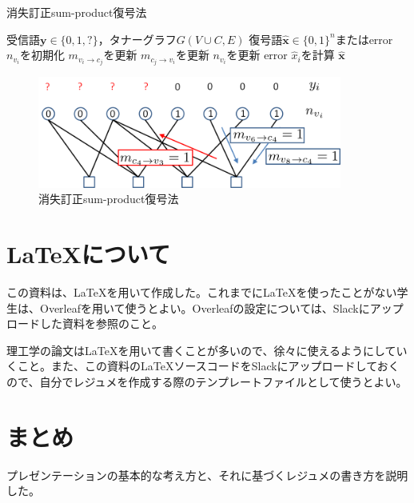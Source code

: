\documentclass[a4j]{jsarticle}
\begin{document}
\begin{algorithm}
\caption{消失訂正sum-product復号法}
\label{alg1}
\begin{algorithmic}
\REQUIRE 受信語$\bm y \in \{ 0, 1, \mathrm{?}\}$，タナーグラフ$G(V \cup C, E)$
\ENSURE 復号語$\hat{\bm x} \in \{ 0, 1\}^n$またはerror
	\STATE $n_{v_i}$を初期化
\ENDFOR
{}
		\STATE $m_{v_i \to c_j}$を更新
	\ENDFOR
		\STATE $m_{c_j \to v_i}$を更新
	\ENDFOR
		\STATE $n_{v_i}$を更新
	\ENDFOR
\ENDWHILE
{}
		\RETURN error
	\ENDIF
	\STATE $\hat{x}_i$を計算
\ENDFOR
\RETURN $\bm \hat{\bm x}$
\end{algorithmic}
\end{algorithm}

\begin{figure} [htbp]
\centering
\includegraphics[width=10cm]{sumproduct.png}
\caption{消失訂正sum-product復号法}
\label{erasure_collecting}
\end{figure}

\section{\LaTeX について}
この資料は、\LaTeX を用いて作成した。これまでに\LaTeX を使ったことがない学生は、Overleafを用いて使うとよい。Overleafの設定については、Slackにアップロードした資料を参照のこと。

理工学の論文は\LaTeX を用いて書くことが多いので、徐々に使えるようにしていくこと。また、この資料の\LaTeX ソースコードをSlackにアップロードしておくので、自分でレジュメを作成する際のテンプレートファイルとして使うとよい。

\section{まとめ}
プレゼンテーションの基本的な考え方と、それに基づくレジュメの書き方を説明した。
\end{document}
